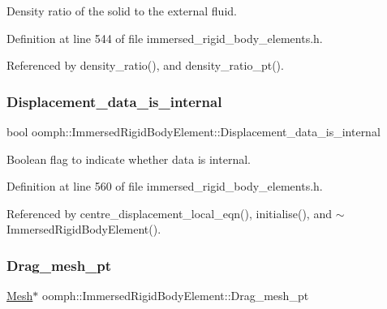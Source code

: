 Density ratio of the solid to the external fluid. 



Definition at line 544 of file immersed\+\_\+rigid\+\_\+body\+\_\+elements.\+h.



Referenced by density\+\_\+ratio(), and density\+\_\+ratio\+\_\+pt().

\mbox{\label{classoomph_1_1ImmersedRigidBodyElement_a6e68c8b6d7e33f0abbf93633f7e2ef69}} 
\subsubsection{\texorpdfstring{Displacement\+\_\+data\+\_\+is\+\_\+internal}{Displacement\_data\_is\_internal}}
{\footnotesize\ttfamily bool oomph\+::\+Immersed\+Rigid\+Body\+Element\+::\+Displacement\+\_\+data\+\_\+is\+\_\+internal\hspace{0.3cm}{\ttfamily [private]}}



Boolean flag to indicate whether data is internal. 



Definition at line 560 of file immersed\+\_\+rigid\+\_\+body\+\_\+elements.\+h.



Referenced by centre\+\_\+displacement\+\_\+local\+\_\+eqn(), initialise(), and $\sim$\+Immersed\+Rigid\+Body\+Element().

\mbox{\label{classoomph_1_1ImmersedRigidBodyElement_ae34b3efd4b3bd9619d9abc371bf7de14}} 
\subsubsection{\texorpdfstring{Drag\+\_\+mesh\+\_\+pt}{Drag\_mesh\_pt}}
{\footnotesize\ttfamily \hyperlink{classoomph_1_1Mesh}{Mesh}$\ast$ oomph\+::\+Immersed\+Rigid\+Body\+Element\+::\+Drag\+\_\+mesh\+\_\+pt\hspace{0.3cm}{\ttfamily [private]}}




